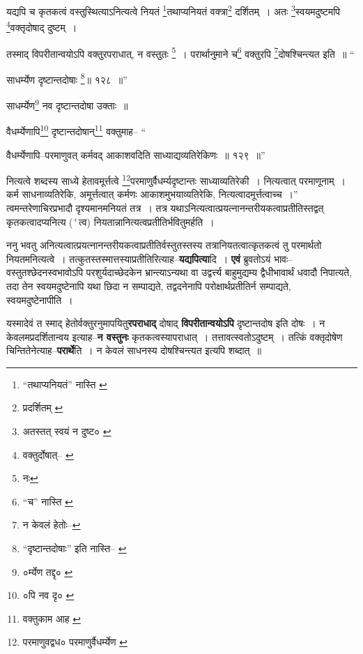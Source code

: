 \documentclass[article,12pt,a4paper]{memoir}
\newcommand{\add}[1]{($^{+}$#1)}
\begin{document}
	यद्यपि च कृतकत्वं वस्तुस्थित्याऽनित्यत्वे नियतं \footnote{“तथाप्यनियतं” नास्ति \cite{dp-msB}}तथाप्यनियतं वक्त्रा\footnote{प्रदर्शितम् \cite{dp-msC}} दर्शितम् । अतः \footnote{अतस्तत् स्वयं न दुष्ट० \cite{dp-msA} \cite{dp-msB} \cite{dp-edP} \cite{dp-edH} \cite{dp-edE} \cite{dp-edN}}स्वयमदुष्टमपि \footnote{वक्तुर्दोषात्--\cite{dp-msA} \cite{dp-edP} \cite{dp-edH} \cite{dp-edE}}वक्तृदोषाद् दुष्टम् । 
	  
	तस्माद् विपरीतान्वयोऽपि वक्तुरपराधात्, न वस्तुतः \footnote{नः} । परार्थानुमाने च\footnote{“च” नास्ति \cite{dp-msC} \cite{dp-msD}} वक्तुरपि \footnote{न केवलं हेतोः--\cite{dp-msD-n}}दोषश्चिन्त्यत इति ॥ “
	  
	साधर्म्येण दृष्टान्तदोषाः \footnote{“दृष्टान्तदोषाः” इति नास्ति--\cite{dp-msB} \cite{dp-edP} \cite{dp-edH} \cite{dp-edE} \cite{dp-edN}}॥ १२८ ॥” 
	  
	साधर्म्येण\footnote{०र्म्येण तद्दृ० \cite{dp-msB}} नव दृष्टान्तदोषा उक्ताः ॥ 
	  
	वैधर्म्येणापि\footnote{०पि नव दृ० \cite{dp-msA} \cite{dp-edP} \cite{dp-edH} \cite{dp-edE} \cite{dp-edN}} दृष्टान्तदोषान्\footnote{वक्तुकाम आह \cite{dp-msB} \cite{dp-msD}} वक्तुमाह-- “
	  
	वैधर्म्येणापि--परमाणुवत् कर्मवद् आकाशवदिति साध्याद्यव्यतिरेकिणः ॥ १२९ ॥” 
	  
	नित्यत्वे शब्दस्य साध्ये हेतावमूर्त्तत्वे \footnote{परमाणुवद्वध० \cite{dp-msA} \cite{dp-edP} \cite{dp-edH} \cite{dp-edE} परमाणुर्वैधर्म्येण \cite{dp-msC}}परमाणुर्वैधर्म्यदृष्टान्तः साध्याव्यतिरेकी । नित्यत्वात् परमाणूनाम् । कर्म साधनाव्यतिरेकि, अमूर्त्तत्वात् कर्मणः आकाशमुभयाव्यतिरेकि, नित्यत्वादमूर्त्तत्वाच्च ।” त्वमन्तरेणाचिरप्रभादौ दृश्यमानमनियतं तत्र । तत्र यथाऽनित्यत्वात्प्रयत्नानन्तरीयकत्वाप्रतीतिस्तद्वत् कृतकत्वादप्यनित्य \add{त्व} नियतान्नानित्यत्वप्रतीतिर्भवितुमर्हति ।
	\pend
      

	  \pstart ननु भवतु अनित्यत्वात्प्रयत्नानन्तरीयकत्वाप्रतीतिर्वस्तुतस्तस्य तत्रानियतत्वात्कृतकत्वं तु परमार्थतो नियतमनित्यत्वे । तत्कुतस्तस्मात्तस्याप्रतीतिरित्याह--\textbf{यद्यपित्या}दि । \textbf{एवं} ब्रुवतोऽयं भावः--वस्तुतश्छेदनस्वभावोऽपि परशुर्यदाच्छेदकेन भ्रान्त्याऽन्यथा वा उद्वर्त्त्य बाहुमुद्यम्य द्वैधीभावार्थं धवादौ निपात्यते, तदा तेन स्वयमदुष्टेनापि यथा छिदा न सम्पाद्यते, तद्वदनेनापि परोक्षार्थप्रतीतिर्न सम्पाद्यते, स्वयमदुष्टेनापीति ।
	\pend
      

	  \pstart यस्मादेवं त \leavevmode{} स्माद् हेतोर्वक्तुरनुमापयितु\textbf{रपराधाद्} दोषाद् \textbf{विपरीतान्वयोऽपि} दृष्टान्तदोष इति दोषः । न केवलमप्रदर्शितान्वय इत्याह--\textbf{न वस्तुनः} कृतकत्वस्यापराधात् । तत्तावत्स्वतोऽदुष्टम् । तत्किं वक्तृदोषेण चिन्तितेनेत्याह--\textbf{परार्थे}ति । न केवलं साधनस्य दोषश्चिन्त्यत इत्यपि शब्दात् ॥
	\pend
      
\end{document}
